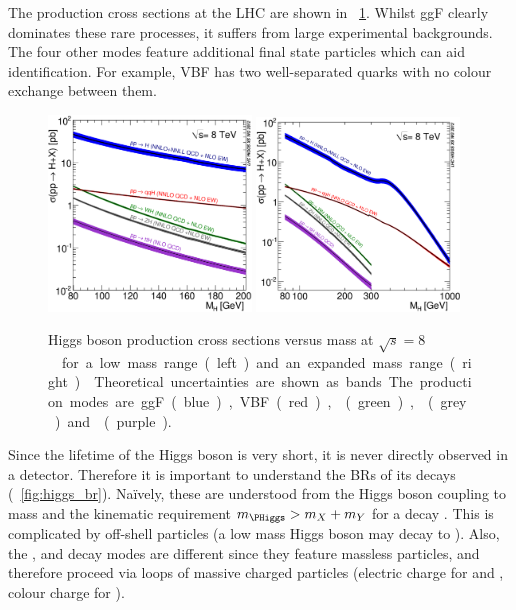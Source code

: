 The production cross sections at the LHC are shown in \Figure~\ref{fig:higgs_xs}. 
Whilst ggF clearly dominates these rare processes, it suffers from large 
experimental backgrounds. The four other modes feature additional final state particles 
which can aid identification. For example, VBF has two well-separated quarks with no 
colour exchange between them.

\begin{figure}[t]
	\includegraphics[width=0.48\textwidth]{tex/motivation/xs_lowrange}
	\hfill
	\includegraphics[width=0.48\textwidth]{tex/motivation/xs_fullrange}
	\caption{Higgs boson production cross sections versus mass at 
	\unit{$\sqrt{s} = 8$}{\TeV} for a low mass range (left) and an expanded mass range 
	(right) \cite{YR2}. Theoretical uncertainties are shown as bands. The production modes
	are ggF (blue), VBF (red), \WH (green), \ZH (grey) and \ttH (purple).}
	\label{fig:higgs_xs}
\end{figure}

Since the lifetime of the Higgs boson is very short, it is never directly observed in a 
detector. Therefore it is important to understand the BRs of its decays 
(\Figure~\ref{fig:higgs_br}). Na\"{i}vely, these are understood from the Higgs boson coupling to mass and the kinematic requirement $m_{\PHiggs} > m_X + m_Y$ for a decay
. This is complicated by off-shell particles (\eg a low mass
Higgs boson may decay to \HepProcess{\PW \PW^{*}}). 
Also, the \HepProcess{\Pphoton \Pphoton}, \HepProcess{\PZ \Pphoton} and 
\HepProcess{\Pgluon \Pgluon} decay modes are different since they feature massless 
particles, and therefore proceed via loops of massive charged particles (electric charge 
for \HepProcess{\Pphoton \Pphoton} and \HepProcess{\PZ \Pphoton}, colour charge for 
\HepProcess{\Pgluon \Pgluon}).

